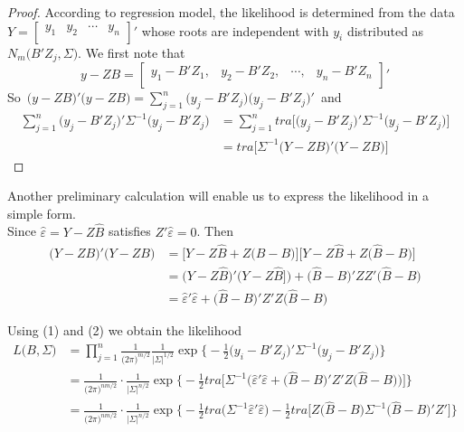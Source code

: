 \documentclass[11pt,a4paper]{article}
\theoremstyle{definition}
\begin{document}
\begin{proof}
According to regression model, the likelihood is determined from the data $Y=
\begin{bmatrix}
y_1 & y_2 & \cdots& y_n\\
\end{bmatrix}'
$ whose roots are independent with $y_i$ distributed as $N_m\big(B'Z_j,\displaystyle{\Sigma}\big)$. We first note that 
$$ y-ZB = 
\begin{bmatrix}
y_1-B'Z_1, & y_2-B'Z_2, & \cdots, & y_n-B'Z_n\\
\end{bmatrix}'
$$ So
\,$\displaystyle{\big(y-ZB\big)'\big(y-ZB\big)=\sum^n_{j=1}\big(y_j-B'Z_j\big)\big(y_j-B'Z_j\big)'}\,$
and 
\begin{align*}
\sum^n_{j=1}\big(y_j-B'Z_j\big)'\Sigma^{-1}\big(y_j-B'Z_j\big) & = \sum^n_{j=1}tra\Big[\big(y_j-B'Z_j\big)'\Sigma^{-1}\big(y_j-B'Z_j\big)\Big]\\
&= tra\Big[\Sigma^{-1}\big(Y-ZB\big)'\big(Y-ZB\big)\Big]\tag{1}
\end{align*}
\end{proof}



Another preliminary calculation will enable us to express the likelihood in a simple form.\\
Since $\widehat{\varepsilon}=Y-Z\hat{B}$ satisfies $Z'\widehat{\varepsilon}=0$. Then 
\begin{align*}
\big(Y-ZB\big)'\big(Y-ZB\big) & = \Big[Y-Z\widehat{B}+Z\big(\widehat{B}-B\big)\Big]\Big[Y-Z\widehat{B}+Z\big(\widehat{B}-B\big)\Big]\\
& = \big(Y-Z\widehat{B}\big)'\big(Y-Z\widehat{B}]\big) + \big(\widehat{B}-B\big)'ZZ'\big(\widehat{B}-B\big)\\
& = \widehat{\varepsilon}'\widehat{\varepsilon} + \big(\widehat{B}-B\big)'Z'Z\big(\widehat{B}-B\big)\tag{2}
\end{align*}

Using (1) and (2) we obtain the likelihood
\begin{align*}
L\big(B,\Sigma\big) & = \prod^n_{j=1}\frac{1}{\big(2\pi\big)^{m/2}}\frac{1}{\big|\Sigma\big|^{1/2}}\exp\Big\{-\frac{1}{2}\big(y_i-B'Z_j\big)'\Sigma^{-1}\big(y_j-B'Z_j\big)\Big\}\\
& = \frac{1}{\big(2\pi\big)^{nm/2}}\cdot \frac{1}{\big|\Sigma\big|^{n/2}}\exp\Big\{-\frac{1}{2}tra\Big[\Sigma^{-1}\big(\widehat{\varepsilon}'\widehat{\varepsilon}+\big(\widehat{B}-B\big)'Z'Z\big(\widehat{B}-B\big)\big)\Big]\Big\}\\
& = \frac{1}{\big(2\pi\big)^{nm/2}}\cdot\frac{1}{\big|\Sigma\big|^{n/2}}\exp\Big\{-\frac{1}{2}tra\Big(\Sigma^{-1}\widehat{\varepsilon}'\widehat{\varepsilon}\Big)-\frac{1}{2}tra\Big[Z\big(\widehat{B}-B\big)\Sigma^{-1}\big(\widehat{B}-B\big)'Z'\Big]\Big\}
\end{align*}
\end{document}
